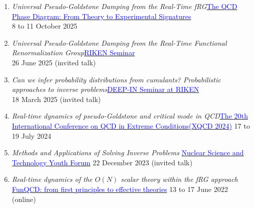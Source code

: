 \documentclass[11pt,a4paper]{article}
\newcommand\dunderline[3][-2pt]{{%
  \sbox0{#3}%
  \ooalign{\copy0\cr\rule[\dimexpr#1-#2\relax]{\wd0}{#2}}}}
\begin{document}
\dunderline{1.5pt}{\large{\textbf{B. Oral Presentations}}}
\vspace{0.5cm}
\begin{enumerate}
\item {\textit{Universal Pseudo-Goldstone Damping from the Real-Time fRG}\newline{}\href{https://indico.ihep.ac.cn/event/25688/}{\textcolor{blue}{The QCD Phase Diagram: From Theory to Experimental Signatures}}\\
8 to 11 October 2025}

\item {\textit{Universal Pseudo-Goldstone Damping from the Real-Time Functional Renormalization Group}\newline{}\href{https://ithems.riken.jp/en/events/universal-pseudo-goldstone-damping-from-the-real-time-functional-renormalization-group}{\textcolor{blue}{RIKEN Seminar}}\\
26 June 2025 (invited talk)}

\item {\textit{Can we infer probability distributions from cumulants? Probabilistic approaches to inverse problems}\newline{}\href{https://ithems.riken.jp/en/events/can-we-infer-probability-distributions-from-cumulants-probabilistic-approaches-to-inverse-problems}{\textcolor{blue}{DEEP-IN Seminar at RIKEN}}\\
18 March 2025 (invited talk)}

\item {\textit{Real-time dynamics of pseudo-Goldstone and critical mode in QCD}\newline{}\href{https://indico.cern.ch/event/1374713/}{\textcolor{blue}{The 20th International Conference on QCD in Extreme Conditions(XQCD 2024)}}
\newline{} 17 to 19 July 2024}


\item {\textit{Methods and Applications of Solving Inverse Problems}\newline{} \href{https://snst.lzu.edu.cn/xueshujiaoliu/2023/1220/237046.html}{\textcolor{blue}{Nuclear Science and Technology Youth Forum}}
\newline{} 22 December 2023 (invited talk)}

\item {\textit{Real-time dynamics of the $O(N)$ scalar theory within the fRG approach}\newline{} \href{https://sites.google.com/view/funqcd22/}{\textcolor{blue}{FunQCD: from first principles to effective theories}}\newline{} 13 to 17 June 2022 (online)}


\end{enumerate}
\end{document}
